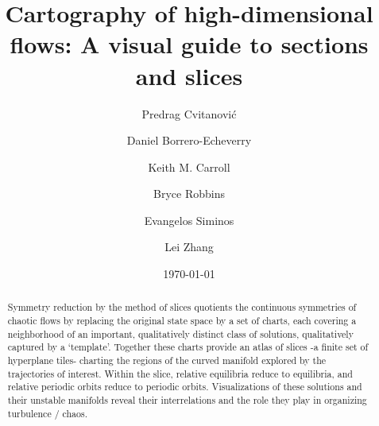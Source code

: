 \documentclass[aip,cha,reprint,
secnumarabic,
nofootinbib, tightenlines,
nobibnotes, showkeys, showpacs,
groupedaddress
]{revtex4-1}
\begin{document}
\title[High-dimensional cartography]
{Cartography of high-dimensional flows: A visual guide to sections and slices}


\author{Predrag Cvitanovi{\'c}}
\author{Daniel Borrero-Echeverry}
\author{Keith M. Carroll}
\author{Bryce Robbins}
\author{Evangelos Siminos}
\author{Lei Zhang}

\date{\today}

\begin{abstract}
Symmetry reduction by the method of slices quotients the continuous
symmetries of chaotic flows by replacing the original state space by a
set of charts, each covering a neighborhood of an important,
qualitatively distinct class of solutions, qualitatively captured by a
`template'. Together these charts provide an atlas of slices -a finite
set of hyperplane tiles- charting the regions of the curved manifold
explored by the trajectories of interest. Within the slice, relative
equilibria reduce to equilibria, and relative periodic orbits reduce to
periodic orbits. Visualizations of these solutions and their unstable
manifolds reveal their interrelations and the role they play in
organizing turbulence / chaos.

\end{abstract}


\maketitle
\end{document}
